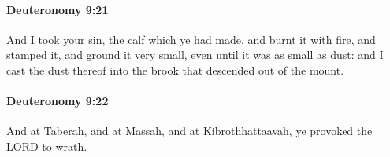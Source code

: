 		\paragraph{Deuteronomy 9:21} %
			\label{DEUTERONOMY-9-21}

			And I took your sin, the calf which ye had made, and burnt it with fire, and stamped it, and ground it very small, even until it was as small as dust: and I cast the dust thereof into the brook that descended out of the mount.


		\paragraph{Deuteronomy 9:22} %
			\label{DEUTERONOMY-9-22}

			And at Taberah, and at Massah, and at Kibrothhattaavah, ye provoked the LORD to wrath.


